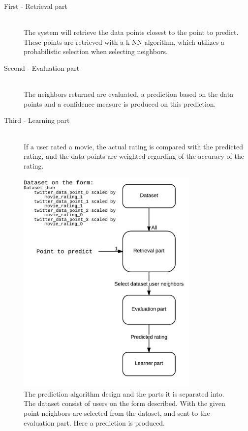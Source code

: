 \begin{description}
    \item[First - Retrieval part] \hfill \\
    The system will retrieve the data points closest to the point to predict. These points are retrieved with a k-NN algorithm, which utilizes a probabilistic selection when selecting neighbors.

    \item[Second - Evaluation part] \hfill \\
    The neighbors returned are evaluated, a prediction based on the data points and a confidence measure is produced on this prediction.

    \item[Third - Learning part] \hfill \\
    If a user rated a movie, the actual rating is compared with the predicted rating, and the data points are weighted regarding of the accuracy of the rating.
\end{description}

\begin{figure}[H]
\centerline{\includegraphics[width=3.5in]{image/pred-alg.png}}
\caption[Prediction algorithm parts]{The prediction algorithm design and the parts it is separated into. The dataset consist of users on the form described. With the given point neighbors are selected from the dataset, and sent to the evaluation part. Here a prediction is produced.}
\label{figure:pred-alg}
\end{figure}
